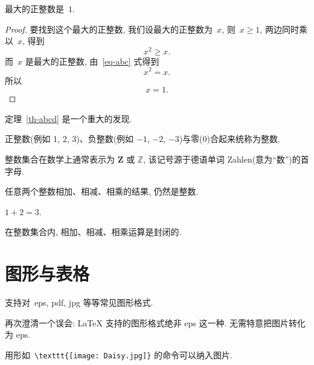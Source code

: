 \documentclass[forprint]{WHUBachelor}
\begin{document}
  \begin{theorem}[谁发现的]\label{th-abcd}
  最大的正整数是~$1$.
  \end{theorem}
  
  \begin{proof}
  要找到这个最大的正整数, 我们设最大的正整数为~$x$, 则~$x \geqslant 1$, 两边同时乘以~$x$, 得到
  \begin{equation}\label{eq-abc}
  x^2 \geqslant x.
  \end{equation}
  而~$x$ 是最大的正整数, 由~\eqref{eq-abc} 式得到
  \[
  x^2 = x.
  \]
  所以
  \begin{equation*}
  x = 1.
  \end{equation*}
  \end{proof}
  
  定理~\ref{th-abcd} 是一个重大的发现.
  
  \begin{definition}[整数]
   正整数(例如 1, 2, 3)、负整数(例如 ${−1}$, $−2$, $−3$)与零(0)合起来统称为{\heiti 整数}.
  \end{definition}
  
  \begin{remark}
    整数集合在数学上通常表示为 $\mathbf{Z}$ 或 $\mathbb{Z}$, 该记号源于德语单词 Zahlen(意为``数'')的首字母.
  \end{remark}
  
  \begin{proposition}
  任意两个整数相加、相减、相乘的结果, 仍然是整数.
  \end{proposition}
  
  \begin{example}
    $1+2=3$.
  \end{example}
  
  \begin{corollary}
     在整数集合内, 相加、相减、相乘运算是封闭的.
  \end{corollary}
  
  \section{图形与表格}
  
  支持对~eps, pdf, jpg 等等常见图形格式.
  
  再次\colorbox{red!45}{澄清一个误会}: \LaTeX{} 支持的图形格式绝非 eps 这一种. 无需特意把图片转化为 eps.
  
  用形如~\verb|\texttt{[image: Daisy.jpg]}| 的命令可以纳入图片.
  
\end{document}
